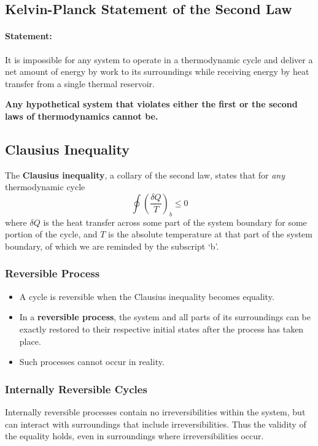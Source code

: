\subsection{Kelvin-Planck Statement of the Second Law}
\paragraph{Statement:}It is impossible for any system to operate in a thermodynamic cycle and deliver a net amount of energy by work to its surroundings while receiving energy by heat transfer from a single thermal reservoir.
\vspace{12pt}

\noindent\textbf{Any hypothetical system that violates either the first or the second laws of thermodynamics cannot be.}

\subsection{Clausius Inequality}
The \textbf{Clausius inequality}, a collary of the second law, states that for \emph{any} thermodynamic cycle
\begin{equation}\label{eq:ClausiusIneq}
\oint \left(\frac{\delta Q}{T}\right)_b \leq 0
\end{equation}
where $\delta Q$ is the heat transfer across some part of the system boundary for some portion of the cycle, and $T$ is the absolute temperature at that part of the system boundary, of which we are reminded by the subscript `b'.
\subsubsection{Reversible Process}
\begin{itemize}
    \item A cycle is reversible when the Clausius inequality becomes equality.
    \item In a \textbf{reversible process}, the system and all parts of its surroundings can be exactly restored to their respective initial states after the process has taken place.
    \item Such processes cannot occur in reality.   
\end{itemize}
\subsubsection{Internally Reversible Cycles}
Internally reversible processes contain no irreversibilities within the system, but can interact with surroundings that include irreversibilities. Thus the validity of the equality holds, even in surroundings where irreversibilities occur. 

